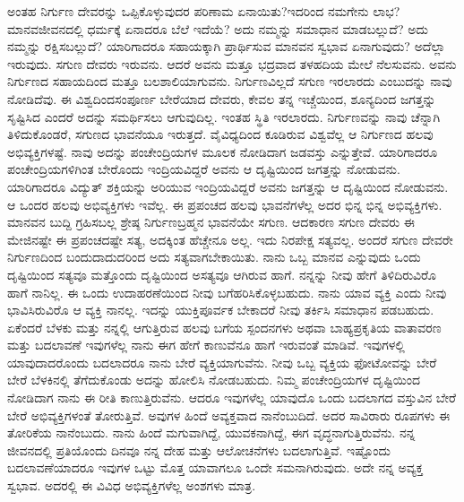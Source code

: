 ಅಂತಹ ನಿರ್ಗುಣ ದೇವರನ್ನು ಒಪ್ಪಿಕೊಳ್ಳುವುದರ ಪರಿಣಾಮ ಏನಾಯಿತು?\break ಇದರಿಂದ ನಮಗೇನು ಲಾಭ? ಮಾನವಜೀವನದಲ್ಲಿ ಧರ್ಮಕ್ಕೆ ಏನಾದರೂ ಬೆಲೆ ಇದೆಯೆ? ಅದು ನಮ್ಮನ್ನು ಸಮಾಧಾನ ಮಾಡಬಲ್ಲುದೆ? ಅದು ನಮ್ಮನ್ನು ರಕ್ಷಿಸಬಲ್ಲುದೆ? ಯಾರಿಗಾದರೂ ಸಹಾಯಕ್ಕಾಗಿ ಪ್ರಾರ್ಥಿಸುವ ಮಾನವನ ಸ್ವಭಾವ ಏನಾಗುವುದು? ಅದೆಲ್ಲಾ ಇರುವುದು. ಸಗುಣ ದೇವರು ಇರುವನು. ಆದರೆ ಅವನು ಮತ್ತೂ ಭದ್ರವಾದ ತಳಹದಿಯ ಮೇಲೆ ನೆಲಸುವನು. ಅವನು ನಿರ್ಗುಣದ ಸಹಾಯದಿಂದ ಮತ್ತೂ ಬಲಶಾಲಿಯಾಗುವನು. ನಿರ್ಗುಣವಿಲ್ಲದೆ ಸಗುಣ ಇರಲಾರದು ಎಂಬುದನ್ನು ನಾವು ನೋಡಿದೆವು. ಈ ವಿಶ್ವದಿಂದ\break ಸಂಪೂರ್ಣ ಬೇರೆಯಾದ ದೇವರು, ಕೇವಲ ತನ್ನ ಇಚ್ಚೆಯಿಂದ, ಶೂನ್ಯದಿಂದ ಜಗತ್ತನ್ನು ಸೃಷ್ಟಿಸಿದ ಎಂದರೆ ಅದನ್ನು ಸಮರ್ಥಿಸಲು ಆಗುವುದಿಲ್ಲ. ಇಂತಹ ಸ್ಥಿತಿ ಇರಲಾರದು. ನಿರ್ಗುಣವನ್ನು ನಾವು ಚೆನ್ನಾಗಿ ತಿಳಿದುಕೊಂಡರೆ, ಸಗುಣದ ಭಾವನೆಯೂ ಇರುತ್ತದೆ. ವೈವಿಧ್ಯದಿಂದ ಕೂಡಿರುವ ವಿಶ್ವವೆಲ್ಲ ಆ ನಿರ್ಗುಣದ ಹಲವು ಅಭಿವ್ಯಕ್ತಿಗಳಷ್ಟೆ. ನಾವು ಅದನ್ನು ಪಂಚೇಂದ್ರಿಯಗಳ ಮೂಲಕ ನೋಡಿದಾಗ ಜಡವಸ್ತು ಎನ್ನುತ್ತೇವೆ. ಯಾರಿಗಾದರೂ ಪಂಚೇಂದ್ರಿಯಗಳಿಗಿಂತ ಬೇರೊಂದು ಇಂದ್ರಿಯವಿದ್ದರೆ ಅವನು ಆ ದೃಷ್ಟಿಯಿಂದ ಜಗತ್ತನ್ನು ನೋಡುವನು. ಯಾರಿಗಾದರೂ ವಿದ್ಯುತ್ ಶಕ್ತಿಯನ್ನು ಅರಿಯುವ ಇಂದ್ರಿಯವಿದ್ದರೆ ಅವನು ಜಗತ್ತನ್ನು ಆ ದೃಷ್ಟಿಯಿಂದ ನೋಡುವನು. ಆ ಒಂದರ ಹಲವು ಅಭಿವ್ಯಕ್ತಿಗಳು ಇವೆಲ್ಲ. ಈ ಪ್ರಪಂಚದ ಹಲವು ಭಾವನೆಗಳೆಲ್ಲ ಅದರ ಭಿನ್ನ ಭಿನ್ನ ಅಭಿವ್ಯಕ್ತಿಗಳು. ಮಾನವನ ಬುದ್ದಿ ಗ್ರಹಿಸಬಲ್ಲ ಶ್ರೇಷ್ಠ ನಿರ್ಗುಣಬ್ರಹ್ಮನ ಭಾವನೆಯೇ ಸಗುಣ. ಆದಕಾರಣ ಸಗುಣ ದೇವರು ಈ ಮೇಜಿನಷ್ಟೇ ಈ ಪ್ರಪಂಚದಷ್ಟೇ ಸತ್ಯ, ಅದಕ್ಕಿಂತ ಹೆಚ್ಚೇನೂ ಅಲ್ಲ. ಇದು ನಿರಪೇಕ್ಷ ಸತ್ಯವಲ್ಲ. ಅಂದರೆ ಸಗುಣ ದೇವರೇ ನಿರ್ಗುಣದಿಂದ ಬಂದುದಾದುದರಿಂದ ಅದು ಸತ್ಯವಾಗಬೇಕಾಯಿತು. ನಾನು ಒಬ್ಬ ಮಾನವ ಎನ್ನುವುದು ಒಂದು ದೃಷ್ಟಿಯಿಂದ ಸತ್ಯವೂ ಮತ್ತೊಂದು ದೃಷ್ಟಿಯಿಂದ ಅಸತ್ಯವೂ ಆಗಿರುವ ಹಾಗೆ. ನನ್ನನ್ನು ನೀವು ಹೇಗೆ ತಿಳಿದಿರುವಿರೊ ಹಾಗೆ ನಾನಿಲ್ಲ. ಈ ಒಂದು ಉದಾಹರಣೆಯಿಂದ ನೀವು ಬಗೆಹರಿಸಿಕೊಳ್ಳಬಹುದು. ನಾನು ಯಾವ ವ್ಯಕ್ತಿ ಎಂದು ನೀವು ಭಾವಿಸಿರುವಿರೊ ಆ ವ್ಯಕ್ತಿ ನಾನಲ್ಲ. ಇದನ್ನು ಯುಕ್ತಿಪೂರ್ವಕ ಬೇಕಾದರೆ ನೀವು ತರ್ಕಿಸಿ ಸಮಾಧಾನ ಪಡಬಹುದು. ಏಕೆಂದರೆ ಬೆಳಕು ಮತ್ತು ನನ್ನಲ್ಲಿ ಆಗುತ್ತಿರುವ ಹಲವು ಬಗೆಯ ಸ್ಪಂದನಗಳು ಅಥವಾ ಬಾಹ್ಯಪ್ರಕೃತಿಯ ವಾತಾವರಣ ಮತ್ತು ಬದಲಾವಣೆ ಇವುಗಳೆಲ್ಲ ನಾನು ಈಗ ಹೇಗೆ ಕಾಣುವೆನೂ ಹಾಗೆ ಇರುವಂತೆ ಮಾಡಿವೆ. ಇವುಗಳಲ್ಲಿ ಯಾವುದಾದರೊಂದು ಬದಲಾದರೂ ನಾನು ಬೇರೆ ವ್ಯಕ್ತಿಯಾಗುವೆನು. ನೀವು ಒಬ್ಬ ವ್ಯಕ್ತಿಯ ಫೋಟೋವನ್ನು ಬೇರೆ ಬೇರೆ ಬೆಳಕಿನಲ್ಲಿ ತೆಗೆದುಕೊಂಡು ಅದನ್ನು ಹೋಲಿಸಿ ನೋಡಬಹುದು. ನಿಮ್ಮ ಪಂಚೇಂದ್ರಿಯಗಳ ದೃಷ್ಟಿಯಿಂದ ನೋಡಿದಾಗ ನಾನು ಈ ರೀತಿ ಕಾಣುತ್ತಿರುವೆನು. ಆದರೂ ಇವುಗಳೆಲ್ಲ ಯಾವುದೊ ಒಂದು ಬದಲಾಗದ ವಸ್ತುವಿನ ಬೇರೆ ಬೇರೆ ಅಭಿವ್ಯಕ್ತಿಗಳಂತೆ ತೋರುತ್ತಿವೆ. ಅವುಗಳ ಹಿಂದೆ ಅವ್ಯಕ್ತವಾದ ನಾನೆಂಬುದಿದೆ. ಅದರ ಸಾವಿರಾರು ರೂಪಗಳು ಈ ತೋರಿಕೆಯ ನಾನೆಂಬುದು. ನಾನು ಹಿಂದೆ ಮಗುವಾಗಿದ್ದೆ, ಯುವಕನಾಗಿದ್ದೆ, ಈಗ ವೃದ್ಧನಾಗುತ್ತಿರುವೆನು. ನನ್ನ ಜೀವನದಲ್ಲಿ ಪ್ರತಿಯೊಂದು ದಿನವೂ ನನ್ನ ದೇಹ ಮತ್ತು ಆಲೋಚನೆಗಳು ಬದಲಾಗುತ್ತಿವೆ. ಇಷ್ಟೊಂದು ಬದಲಾವಣೆಯಾದರೂ ಇವುಗಳ ಒಟ್ಟು ಮೊತ್ತ ಯಾವಾಗಲೂ ಒಂದೇ ಸಮನಾಗಿರುವುದು. ಅದೇ ನನ್ನ ಅವ್ಯಕ್ತ ಸ್ವಭಾವ. ಅದರಲ್ಲಿ ಈ ವಿವಿಧ ಅಭಿವ್ಯಕ್ತಿಗಳೆಲ್ಲ ಅಂಶಗಳು ಮಾತ್ರ.

